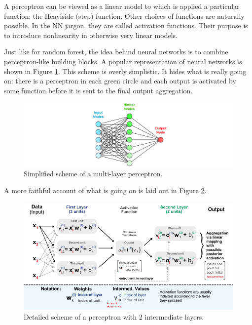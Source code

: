 \documentclass[]{krantz}
\theoremstyle{definition}
\theoremstyle{definition}
\theoremstyle{definition}
\theoremstyle{remark}
\begin{document}
A perceptron can be viewed as a linear model to which is applied a
particular function: the Heaviside (step) function. Other choices of
functions are naturally possible. In the NN jargon, they are called
activation functions. Their purpose is to introduce nonlinearity in
otherwise very linear models.

Just like for random forest, the idea behind neural networks is to
combine perceptron-like building blocks. A popular representation of
neural networks is shown in Figure \ref{fig:NNnaive}. This scheme is
overly simplistic. It hides what is really going on: there is a
perceptron in each green circle and each output is activated by some
function before it is sent to the final output aggregation.

\begin{figure}[H]

{\centering \includegraphics[width=480px]{images/nn} 

}

\caption{Simplified scheme of a multi-layer perceptron.}\label{fig:NNnaive}
\end{figure}

A more faithful account of what is going on is laid out in Figure
\ref{fig:MLperceptron}.

\begin{figure}[H]

{\centering \includegraphics[width=16.53in]{images/NN_scheme} 

}

\caption{Detailed scheme of a perceptron with 2 intermediate layers.}\label{fig:MLperceptron}
\end{figure}
\end{document}
